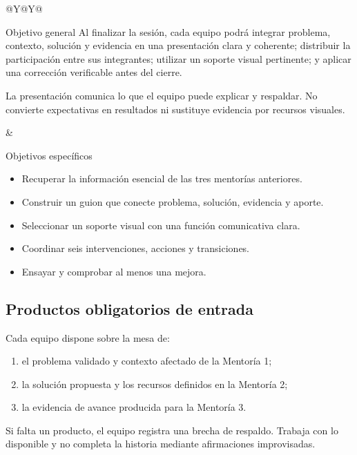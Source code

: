 \documentclass[10pt,a4paper]{article}
\begin{document}
\begin{tabularx}{\textwidth}{@{}Y@{\hspace{5mm}}Y@{}}
\begin{docbox}[height=64mm]{Objetivo general}
Al finalizar la sesión, cada equipo podrá integrar problema, contexto, solución y evidencia en una presentación clara y coherente; distribuir la participación entre sus integrantes; utilizar un soporte visual pertinente; y aplicar una corrección verificable antes del cierre.

\vspace{2mm}
La presentación comunica lo que el equipo puede explicar y respaldar. No convierte expectativas en resultados ni sustituye evidencia por recursos visuales.
\end{docbox}
&
\begin{docbox}[height=64mm]{Objetivos específicos}
\begin{itemize}
  \item Recuperar la información esencial de las tres mentorías anteriores.
  \item Construir un guion que conecte problema, solución, evidencia y aporte.
  \item Seleccionar un soporte visual con una función comunicativa clara.
  \item Coordinar seis intervenciones, acciones y transiciones.
  \item Ensayar y comprobar al menos una mejora.
\end{itemize}
\end{docbox}
\end{tabularx}

\subsection{Productos obligatorios de entrada}
Cada equipo dispone sobre la mesa de:
\begin{enumerate}
  \item el problema validado y contexto afectado de la Mentoría 1;
  \item la solución propuesta y los recursos definidos en la Mentoría 2;
  \item la evidencia de avance producida para la Mentoría 3.
\end{enumerate}

Si falta un producto, el equipo registra una brecha de respaldo. Trabaja con lo disponible y no completa la historia mediante afirmaciones improvisadas.
\end{document}
